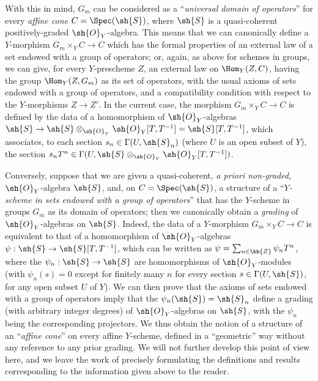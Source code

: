 \begin{remark}[8.3.9]
With this in mind, $G_m$ can be considered as a ``\emph{universal domain of operators}'' for every \emph{affine cone} $C=\Spec(\sh{S})$, where $\sh{S}$ is a quasi-coherent positively-graded $\sh{O}_Y$-algebra.
This means that we can canonically define a $Y$-morphism $G_m\times_Y C\to C$ which has the formal properties of an external law of a set endowed with a group of operators;
or, again, as above for schemes in groups, we can give, for every $Y$-prescheme $Z$, an external law on $\Hom_Y(Z,C)$, having the group $\Hom_Y(Z,G_m)$ as its set of operators, with the usual axioms of sets endowed with a group of operators, and a compatibility condition with respect to the $Y$-morphisms $Z\to Z'$.
In the current case, the morphism $G_m\times_Y C\to C$ is defined by the data of a homomorphism of $\sh{O}_Y$-algebras $\sh{S} \to \sh{S}\otimes_{\sh{O}_Y}\sh{O}_Y[T,T^{-1}] = \sh{S}[T,T^{-1}]$, which associates, to each section $s_n\in\Gamma(U,\sh{S}_n)$ (where $U$ is an open subset of $Y$), the section $s_n T^n\in\Gamma(U,\sh{S}\otimes_{\sh{O}_Y}\sh{O}_Y[T,T^{-1}])$.

Conversely, suppose that we are given a quasi-coherent, \emph{a priori non-graded}, $\sh{O}_Y$-algebra $\sh{S}$, and, on $C=\Spec(\sh{S})$, a structure of a ``\emph{$Y$-scheme in sets endowed with a group of operators}'' that has the $Y$-scheme in groups $G_m$ as its domain of operators;
then we canonically obtain a \emph{grading} of $\sh{O}_Y$-algebras on $\sh{S}$.
Indeed, the data of a $Y$-morphism $G_m\times_Y C\to C$ is equivalent to that of a homomorphism of $\sh{O}_Y$-algebras $\psi:\sh{S}\to\sh{S}[T,T^{-1}]$, which can be written as $\psi=\sum_{n\in\bb{Z}}\psi_n T^n$, where the $\psi_n:\sh{S}\to\sh{S}$ are homomorphisms of $\sh{O}_Y$-modules (with $\psi_n(s)=0$ except for finitely many $n$ for every section $s\in\Gamma(U,\sh{S})$, for any open subset $U$ of $Y$).
We can then prove that the axioms of sets endowed with a group of operators imply that the $\psi_n(\sh{S})=\sh{S}_n$ define a grading (with arbitrary integer degrees) of $\sh{O}_Y$-algebras on $\sh{S}$, with the $\psi_n$ being the corresponding projectors.
We thus obtain the notion of a structure of an ``\emph{affine cone}'' on every affine $Y$-scheme, defined in a ``geometric'' way without any reference to any prior grading.
We will not further develop this point of view here, and we leave the work of precisely formulating the definitions and results corresponding to the information given above to the reader.
\end{remark}


